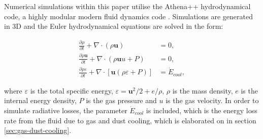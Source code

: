 Numerical simulations within this paper utilise the Athena++ hydrodynamical code, a highly modular modern fluid dynamics code \parencite{stoneAthenaAdaptiveMesh2020}.
Simulations are generated in 3D and the Euler hydrodynamical equations are solved in the form:

\begin{subequations}
  \begin{align}
    \frac{\partial\rho}{\partial t}+\nabla \cdot \left(\rho \boldsymbol{u}\right) & = 0 , \\
    \frac{\partial \rho \boldsymbol{u}}{\partial t} + \nabla \cdot \left(\rho \boldsymbol{u} u + P \right) & = 0, \\
    \frac{\partial \rho \varepsilon}{\partial t} + \nabla \cdot \left[ \boldsymbol{u} \left( \rho\varepsilon + P \right) \right] & = \dot E_{cool} , 
  \end{align}
\end{subequations}

where $\varepsilon$ is the total specific energy, $\varepsilon = \boldsymbol{u}^2/2 + e/\rho $, $\rho$ is the mass density, $e$ is the internal energy density, $P$ is the gas pressure and $u$ is the gas velocity.
In order to simulate radiative losses, the parameter $\dot E_{cool}$ is included, which is the energy loss rate from the fluid due to gas and dust cooling, which is elaborated on in section \ref{sec:gas-dust-cooling}.


